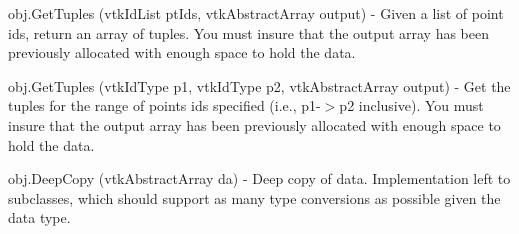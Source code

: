 \begin{DoxyItemize}
\item {\ttfamily obj.\-Get\-Tuples (vtk\-Id\-List pt\-Ids, vtk\-Abstract\-Array output)} -\/ Given a list of point ids, return an array of tuples. You must insure that the output array has been previously allocated with enough space to hold the data.  
\item {\ttfamily obj.\-Get\-Tuples (vtk\-Id\-Type p1, vtk\-Id\-Type p2, vtk\-Abstract\-Array output)} -\/ Get the tuples for the range of points ids specified (i.\-e., p1-\/$>$p2 inclusive). You must insure that the output array has been previously allocated with enough space to hold the data.  
\item {\ttfamily obj.\-Deep\-Copy (vtk\-Abstract\-Array da)} -\/ Deep copy of data. Implementation left to subclasses, which should support as many type conversions as possible given the data type.


\end{DoxyItemize}
